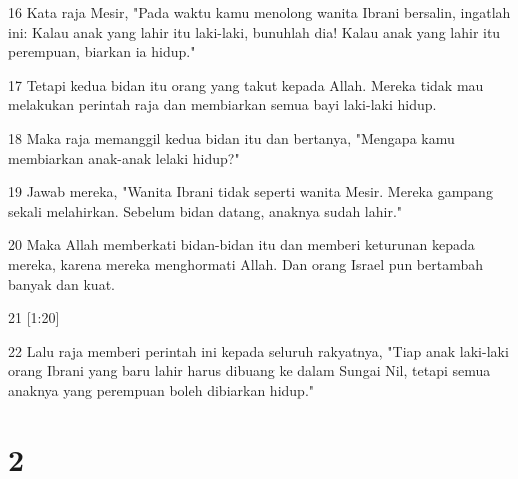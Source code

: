 \par 16 Kata raja Mesir, "Pada waktu kamu menolong wanita Ibrani bersalin, ingatlah ini: Kalau anak yang lahir itu laki-laki, bunuhlah dia! Kalau anak yang lahir itu perempuan, biarkan ia hidup."
\par 17 Tetapi kedua bidan itu orang yang takut kepada Allah. Mereka tidak mau melakukan perintah raja dan membiarkan semua bayi laki-laki hidup.
\par 18 Maka raja memanggil kedua bidan itu dan bertanya, "Mengapa kamu membiarkan anak-anak lelaki hidup?"
\par 19 Jawab mereka, "Wanita Ibrani tidak seperti wanita Mesir. Mereka gampang sekali melahirkan. Sebelum bidan datang, anaknya sudah lahir."
\par 20 Maka Allah memberkati bidan-bidan itu dan memberi keturunan kepada mereka, karena mereka menghormati Allah. Dan orang Israel pun bertambah banyak dan kuat.
\par 21 [1:20]
\par 22 Lalu raja memberi perintah ini kepada seluruh rakyatnya, "Tiap anak laki-laki orang Ibrani yang baru lahir harus dibuang ke dalam Sungai Nil, tetapi semua anaknya yang perempuan boleh dibiarkan hidup."

\chapter{2}


